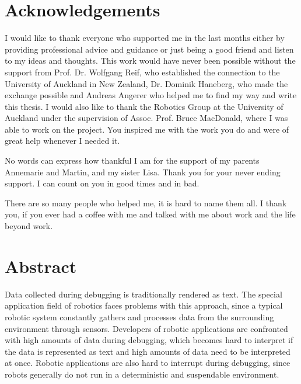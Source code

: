 \documentclass[12pt,a4paper,headsepline,footsepline,DIV13,BCOR12mm]{scrbook}
\begin{document}
 
\newpage

\renewcommand{\baselinestretch}{2} %


\chapter*{Acknowledgements}
I would like to thank everyone who supported me in the last months either by providing professional advice and guidance or just being a good friend and listen to my ideas and thoughts. This work would have never been possible without the support from Prof. Dr. Wolfgang Reif, who established the connection to the University of Auckland in New Zealand, Dr. Dominik Haneberg, who made the exchange possible and Andreas Angerer who helped me to find my way and write this thesis. I would also like to thank the Robotics Group at the University of Auckland under the supervision of Assoc. Prof. Bruce MacDonald, where I was able to work on the project. You inspired me with the work you do and were of great help whenever I needed it.

No words can express how thankful I am for the support of my parents Annemarie and Martin, and my sister Lisa. Thank you for your never ending support. I can count on you in good times and in bad.

There are so many people who helped me, it is hard to name them all. I thank you, if you ever had a coffee with me and talked with me about work and the life beyond work.

\newpage
\chapter*{Abstract}
Data collected during debugging is traditionally rendered as text. The special application field of robotics faces problems with this approach, since a typical robotic system constantly gathers and processes data from the surrounding environment through sensors. Developers of robotic applications are confronted with high amounts of data during debugging, which becomes hard to interpret if the data is represented as text and high amounts of data need to be interpreted at once. Robotic applications are also hard to interrupt during debugging, since robots generally do not run in a deterministic and suspendable environment.
\end{document}
